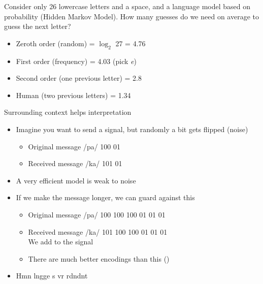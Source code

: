 \documentclass[headrule,footrule]{foils}
\begin{document}

Consider only 26 lowercase letters and a space, and a language model
based on probability (Hidden Markov Model).  How many guesses do we
need on average to guess the next letter?

\begin{itemize}
\item Zeroth order (random) = $\log_2$ 27 = 4.76
\item First order (frequency) = 4.03 \hfill (pick \textit{e})
\item Second order (one previous letter) = 2.8
\item Human (two previous letters) = 1.34
\end{itemize}

Surrounding context helps interpretation



\begin{itemize}
\item Imagine you want to send a signal, but randomly a bit gets flipped (noise)
  \begin{itemize}
  \item Original message /pa/ 100 01
  \item Received message /ka/ 101 01
  \end{itemize}
\item A very efficient model is weak to noise
\item If we make the message longer, we can guard against this
  \begin{itemize}
  \item Original message /pa/ 100 100 100 01 01 01
  \item Received message /ka/ 101 100 100 01 01 01
\\   We add  to the signal
\item There are much better encodings than this ()
\end{itemize}
\item Hmn lngge s vr rdndnt 
\end{itemize}
\end{document}
